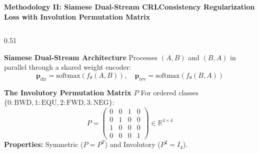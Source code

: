 \documentclass[aspectratio=169,10pt]{beamer}
\begin{document}
\begin{frame}{\textbf{Methodology II: Siamese Dual-Stream CRL}}{\textbf{Consistency Regularization Loss with Involution Permutation Matrix}}
  \begin{columns}[T]
    \begin{column}{0.51\textwidth}
      \begin{block}{\textbf{Siamese Dual-Stream Architecture}}
        \footnotesize
        Processes $(A, B)$ and $(B, A)$ in parallel through a shared weight encoder:
        \vspace{-2pt}
        \[ \mathbf{p}_{\text{dir}} = \text{softmax}(f_\theta(A, B)), \quad \mathbf{p}_{\text{rev}} = \text{softmax}(f_\theta(B, A)) \]
        \vspace{-2pt}
      \end{block}
      \vspace{0.05cm}
      \begin{block}{\textbf{The Involutory Permutation Matrix $P$}}
        \footnotesize
        For ordered classes $\{0:\text{BWD}, 1:\text{EQU}, 2:\text{FWD}, 3:\text{NEG}\}$:
        \vspace{-2pt}
        \[ P = \begin{pmatrix} 0 & 0 & 1 & 0 \\ 0 & 1 & 0 & 0 \\ 1 & 0 & 0 & 0 \\ 0 & 0 & 0 & 1 \end{pmatrix} \in \mathbb{R}^{4 \times 4} \]
        \vspace{-2pt}
        \textbf{Properties:} Symmetric ($P = P^T$) and Involutory ($P^2 = I_4$).
      \end{block}
    \end{column}


\end{columns}
\end{frame}
\end{document}
